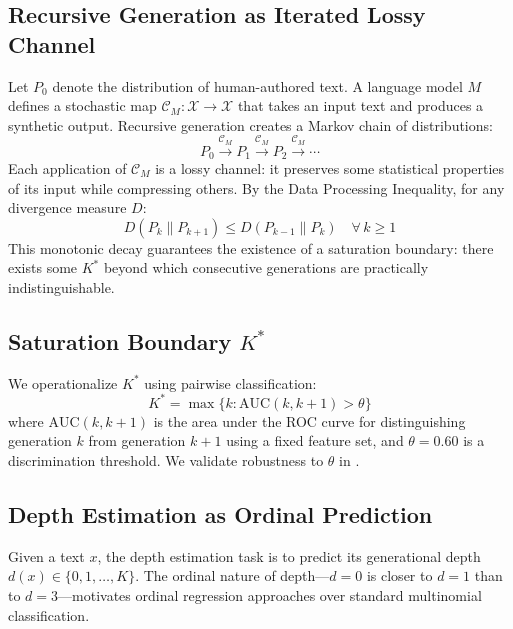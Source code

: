 \documentclass[11pt,a4paper]{article}
\begin{document}
\subsection{Recursive Generation as Iterated Lossy Channel}

Let $P_0$ denote the distribution of human-authored text. A language model $M$ defines a stochastic map $\mathcal{C}_M: \mathcal{X} \to \mathcal{X}$ that takes an input text and produces a synthetic output. Recursive generation creates a Markov chain of distributions:
\begin{equation}
P_0 \xrightarrow{\mathcal{C}_M} P_1 \xrightarrow{\mathcal{C}_M} P_2 \xrightarrow{\mathcal{C}_M} \cdots
\end{equation}
Each application of $\mathcal{C}_M$ is a lossy channel: it preserves some statistical properties of its input while compressing others. By the Data Processing Inequality, for any divergence measure $D$:
\begin{equation}
D(P_k \| P_{k+1}) \leq D(P_{k-1} \| P_k) \quad \forall\, k \geq 1
\end{equation}
This monotonic decay guarantees the existence of a saturation boundary: there exists some $K^*$ beyond which consecutive generations are practically indistinguishable.

\subsection{Saturation Boundary $K^*$}

We operationalize $K^*$ using pairwise classification:
\begin{equation}
K^* = \max\{k : \text{AUC}(k, k+1) > \theta\}
\end{equation}
where $\text{AUC}(k, k+1)$ is the area under the ROC curve for distinguishing generation $k$ from generation $k+1$ using a fixed feature set, and $\theta = 0.60$ is a discrimination threshold. We validate robustness to $\theta$ in .

\subsection{Depth Estimation as Ordinal Prediction}

Given a text $x$, the depth estimation task is to predict its generational depth $d(x) \in \{0, 1, \ldots, K\}$. The ordinal nature of depth---$d=0$ is closer to $d=1$ than to $d=3$---motivates ordinal regression approaches over standard multinomial classification.
\end{document}
